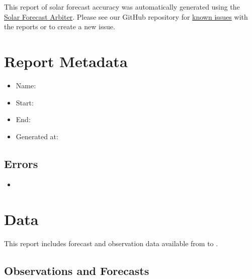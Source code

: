 \documentclass[12pt,letterpaper]{article}
\begin{document}
\title{}
\maketitle
This report of solar forecast accuracy was automatically generated using the
\href{https://solarforecastarbiter.org}{Solar Forecast Arbiter}. Please see
our GitHub repository for
\href{https://github.com/solararbiter/solarforecastarbiter-core/issues?q=is%3Aissue+is%3Aopen+label%3Areports}{known issues}
with the reports or to create a new issue.

\tableofcontents
\cleardoublepage
\listoffigures
\cleardoublepage
\listoftables
\cleardoublepage

\section{Report Metadata}

\begin{itemize}
  \item Name: 
  \item Start: 
  \item End: 
  \item Generated at: 
\end{itemize}

\subsection{Errors}

\begin{itemize}
  \item {}
\end{itemize}

\section{Data}

This report includes forecast and observation data available from
 to .

\subsection{Observations and Forecasts}
\end{document}

